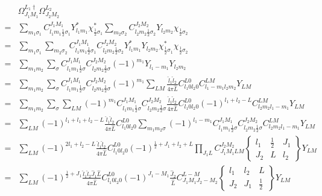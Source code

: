 \documentclass[a4paper]{article}
\newcommand{\no}{\nonumber}
\begin{document}
\begin{align}
\no&\Omega_{J_{1}M_{1}}^{L_{1}\dag}\Omega_{J_{2}M_{2}}^{L_{2}}\\
\no=&\sum_{m_{1}\sigma_{1}}C_{l_{1}m_{1}\frac{1}{2}\sigma_{1}}^{J_{1}M_{1}}Y_{l_{1}m_{1}}^{*}\chi_{\frac{1}{2}\sigma_{1}}^{*}\sum_{m_{2}\sigma_{2}}C_{l_{2}m_{2}\frac{1}{2}\sigma_{2}}^{J_{2}M_{2}}Y_{l_{2}m_{2}}\chi_{\frac{1}{2}\sigma_{2}}\\
\no=&\sum_{m_{1}\sigma_{1}}\sum_{m_{2}\sigma_{2}}C_{l_{1}m_{1}\frac{1}{2}\sigma_{1}}^{J_{1}M_{1}}C_{l_{2}m_{2}\frac{1}{2}\sigma_{2}}^{J_{2}M_{2}}Y_{l_{1}m_{1}}^{*}Y_{l_{2}m_{2}}\chi_{\frac{1}{2}\sigma_{1}}^{*}\chi_{\frac{1}{2}\sigma_{2}}\\
\no=&\sum_{m_{1}m_{2}}\sum_{\sigma}C_{l_{1}m_{1}\frac{1}{2}\sigma}^{J_{1}M_{1}}C_{l_{2}m_{2}\frac{1}{2}\sigma}^{J_{2}M_{2}}(-1)^{m_{1}}Y_{l_{1}-m_{1}}Y_{l_{2}m_{2}}\\
\no=&\sum_{m_{1}m_{2}}\sum_{\sigma}C_{l_{1}m_{1}\frac{1}{2}\sigma}^{J_{1}M_{1}}C_{l_{2}m_{2}\frac{1}{2}\sigma}^{J_{2}M_{2}}(-1)^{m_{1}}\sum_{LM}\frac{\hat{l}_{1}\hat{l}_{2}}{4\pi \hat{L}}C_{l_{1}0l_{2}0}^{L0}C_{l_{1}-m_{1}l_{2}m_{2}}^{LM}Y_{LM}\\
\no=&\sum_{m_{1}m_{2}}\sum_{\sigma}\sum_{LM}(-1)^{m_{1}}C_{l_{1}m_{1}\frac{1}{2}\sigma}^{J_{1}M_{1}}C_{l_{2}m_{2}\frac{1}{2}\sigma}^{J_{2}M_{2}}\frac{\hat{l}_{1}\hat{l}_{2}}{4\pi \hat{L}}C_{l_{1}0l_{2}0}^{L0}(-1)^{l_{1}+l_{2}-L}C_{l_{2}m_{2}l_{1}-m_{1}}^{LM}Y_{LM}\\
\no=&\sum_{LM}(-1)^{l_{1}+l_{1}+l_{2}-L}\frac{\hat{l}_{1}\hat{l}_{2}}{4\pi\hat{L}}C_{l_{1}0l_{2}0}^{L0}\sum_{m_{1}m_{2}\sigma}(-1)^{l_{1}-m_{1}}C_{l_{1}m_{1}\frac{1}{2}\sigma}^{J_{1}M_{1}}C_{l_{2}m_{2}\frac{1}{2}\sigma}^{J_{2}M_{2}}C_{l_{2}m_{2}l_{1}-m_{1}}^{LM}Y_{LM}\\
\no=&\sum_{LM}(-1)^{2l_{1}+l_{2}-L}\frac{\hat{l}_{1}\hat{l}_{2}}{4\pi\hat{L}}C_{l_{1}0l_{2}0}^{L0}(-1)^{\frac{1}{2}+J_{1}+l_{2}+L}\prod_{J_{1}L}C_{J_{1}M_{1}LM}^{J_{2}M_{2}}\left\{\begin{array}{ccc}l_{1}&\frac{1}{2}&J_{1}\\J_{2}&L&l_{2}\end{array}\right\}Y_{LM}\\
\no=&\sum_{LM}(-1)^{\frac{1}{2}+J_{1}}\frac{\hat{l}_{1}\hat{l}_{2}\hat{J}_{1}\hat{L}}{4\pi\hat{L}}C_{l_{1}0l_{2}0}^{L0}(-1)^{J_{1}-M_{1}}\frac{\hat{J}_{2}}{\hat{L}}C_{J_{1}M_{1}J_{2}-M_{2}}^{L-M}\left\{\begin{array}{ccc}l_{1}&l_{2}&L\\J_{2}&J_{1}&\frac{1}{2}\end{array}\right\}Y_{LM}\\

\end{align}
\end{document}
